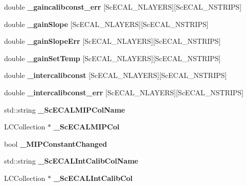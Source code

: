 \begin{DoxyCompactItemize}
\item 
double {\bfseries \_\-gaincalibconst\_\-err} [ScECAL\_\-NLAYERS][ScECAL\_\-NSTRIPS]\label{classCALICE_1_1IntegratedScECALCalibrationProcessor_ad6651fc69410049bdde46bfda31192e3}

\item 
double {\bfseries \_\-gainSlope} [ScECAL\_\-NLAYERS][ScECAL\_\-NSTRIPS]\label{classCALICE_1_1IntegratedScECALCalibrationProcessor_a0c09c5acb333c533ac0dc9d5081c6076}

\item 
double {\bfseries \_\-gainSlopeErr} [ScECAL\_\-NLAYERS][ScECAL\_\-NSTRIPS]\label{classCALICE_1_1IntegratedScECALCalibrationProcessor_ad9122fb35196a1e8c128bc810dd73f48}

\item 
double {\bfseries \_\-gainSetTemp} [ScECAL\_\-NLAYERS][ScECAL\_\-NSTRIPS]\label{classCALICE_1_1IntegratedScECALCalibrationProcessor_a0d302f9a7fe000202b8e2b3315e37a42}

\item 
double {\bfseries \_\-intercalibconst} [ScECAL\_\-NLAYERS][ScECAL\_\-NSTRIPS]\label{classCALICE_1_1IntegratedScECALCalibrationProcessor_a19843391c2f2d492ee8d07cf560d61b3}

\item 
double {\bfseries \_\-intercalibconst\_\-err} [ScECAL\_\-NLAYERS][ScECAL\_\-NSTRIPS]\label{classCALICE_1_1IntegratedScECALCalibrationProcessor_a447fee3ab3e691f7753e77849a3f5156}

\item 
std::string {\bfseries \_\-ScECALMIPColName}\label{classCALICE_1_1IntegratedScECALCalibrationProcessor_a23fa64acf0c4c56a27cd218e45a72a95}

\item 
LCCollection $\ast$ {\bfseries \_\-ScECALMIPCol}\label{classCALICE_1_1IntegratedScECALCalibrationProcessor_af9da8b814eec1d7428a50f752826816b}

\item 
bool {\bfseries \_\-MIPConstantChanged}\label{classCALICE_1_1IntegratedScECALCalibrationProcessor_a7adcc04792d1e9c91be42fffb9650ecb}

\item 
std::string {\bfseries \_\-ScECALIntCalibColName}\label{classCALICE_1_1IntegratedScECALCalibrationProcessor_a06cf578e8d2e90e83423c4cda9212719}

\item 
LCCollection $\ast$ {\bfseries \_\-ScECALIntCalibCol}\label{classCALICE_1_1IntegratedScECALCalibrationProcessor_a0ff44ca5a38c2b4b95b6f66e532c0f0f}


\end{DoxyCompactItemize}
